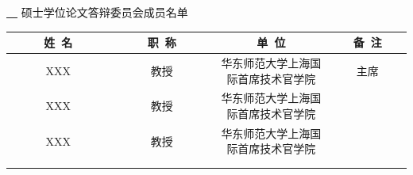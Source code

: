 \thispagestyle{empty}
\vspace*{2em}



%


\makeatletter
\begin{center}\STSong{}
 \underline{\ \@cauthor\ } 硕士学位论文答辩委员会成员名单
\end{center}
\makeatother

\begin{center}
\renewcommand{\arraystretch}{1.4}
  \begin{tabular}{|c|c|c|c|} \hline
   ~~~~~姓~名~~~~~ & ~~~~~职~称~~~~~
   & \hspace{6em}单~位\hspace{6em} & ~~~备~注~~~\\\hline
         XXX    &   教授    &  华东师范大学上海国际首席技术官学院  & 主席  \\ \hline
         XXX    &   教授    &  华东师范大学上海国际首席技术官学院  &       \\ \hline
         XXX    &   教授    &  华东师范大学上海国际首席技术官学院  &       \\ \hline
                &           &                   &       \\ \hline
                &           &                   &       \\ \hline
  \end{tabular}
\end{center}
